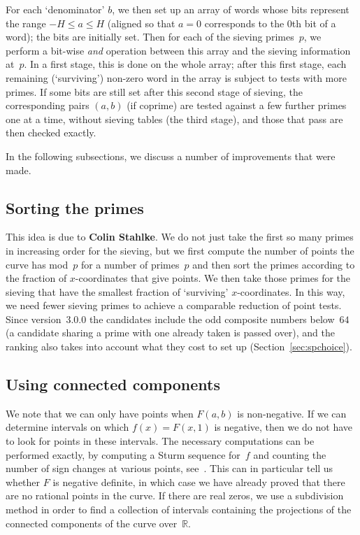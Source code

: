 \documentclass[12pt,a4paper,oneside]{amsart}
\newcommand{\R}{{\mathbb R}}
\begin{document}
For each `denominator' $b$, we then set up an array of words whose bits
represent the range \hbox{$-H \le a \le H$} (aligned so that $a = 0$ corresponds
to the $0$th bit of a word); the bits are initially set. Then for each
of the sieving primes~$p$, we perform a bit-wise {\em and} operation
between this array and the sieving information at~$p$. In a first stage,
this is done on the whole array; after this first stage, each remaining
(`surviving') non-zero word in the array is subject to tests with more
primes. If some bits are still set after this second stage of sieving,
the corresponding pairs $(a, b)$ (if coprime) are tested against a few
further primes one at a time, without sieving tables (the third stage),
and those that pass are then checked exactly.

In the following subsections, we discuss a number of improvements that
were made.

\subsection{Sorting the primes}

This idea is due to \textbf{Colin Stahlke}. We do not just take the first so many
primes in increasing order for the sieving, but we first compute the
number of points the curve has mod~$p$ for a number of primes~$p$ and then
sort the primes according to the fraction of $x$-coordinates that give points.
We then take those primes for the sieving that have the smallest fraction
of `surviving' $x$-coordinates. In this way, we need fewer sieving primes
to achieve a comparable reduction of point tests. Since version~3.0.0 the
candidates include the odd composite numbers below~$64$
(a candidate sharing a prime with one already taken is passed over),
and the ranking also takes into account what they cost to set up
(Section~\ref{sec:spchoice}).

\subsection{Using connected components}

We note that we can only have points when $F(a, b)$ is non-negative.
If we can determine intervals on which $f(x) = F(x, 1)$ is negative, then
we do not have to look for points in these intervals. The necessary
computations can be performed exactly, by computing a Sturm sequence
for~$f$ and counting the number of sign changes at various points,
see~\cite[Thm.~4.1.10]{Cohen}. This can in particular tell us whether
$F$ is negative definite, in which case we have already proved that there
are no rational points in the curve. If there are real zeros, we use
a subdivision method in order to find a collection of intervals containing
the projections of the connected components of the curve over~$\R$.
\end{document}
